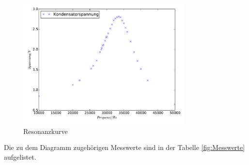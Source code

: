 \begin{figure}
  \centering
  \includegraphics[width=0.78\textwidth]{Resonanzkurve.pdf}
  \caption{Resonanzkurve}
  \label{fig:Resonanzkurve}
\end{figure}
Die zu dem Diagramm zugehörigen Messwerte sind in der Tabelle \ref{fig:Messwerte}
aufgelistet.
